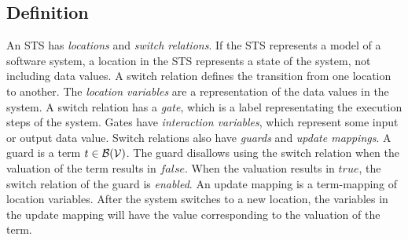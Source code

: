 \subsection{Definition}\label{sec:sts_definition}
An STS has \textit{locations} and \textit{switch relations}. If the STS represents a model of a software system, a location in the STS represents a state of the system, not including data values. A switch relation defines the transition from one location to another. The \textit{location variables} are a representation of the data values in the system. A switch relation has a \textit{gate}, which is a label representating the execution steps of the system. Gates have \textit{interaction variables}, which represent some input or output data value. Switch relations also have \textit{guards} and \textit{update mappings}. A guard is a term $t \in \mathcal{B}(\mathcal{V})$. The guard disallows using the switch relation when the valuation of the term results in $\mathit{false}$. When the valuation results in $\mathit{true}$, the switch relation of the guard is \textit{enabled}. An update mapping is a term-mapping of location variables. After the system switches to a new location, the variables in the update mapping will have the value corresponding to the valuation of the term.
\vspace{10px}
